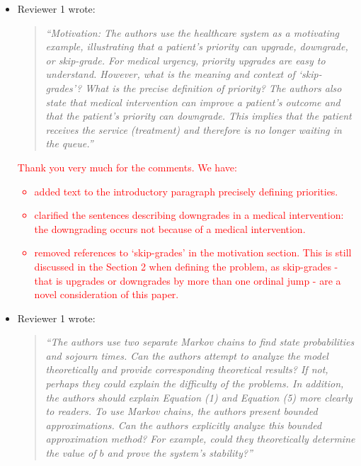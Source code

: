 \documentclass{article}
\begin{document}
\begin{itemize}

\item Reviewer 1 wrote:
\begin{quote}\it
``Motivation: The authors use the healthcare system as a motivating example, illustrating that a patient’s priority can upgrade, downgrade, or skip-grade. For medical urgency, priority upgrades are easy to understand. However, what is the meaning and context of `skip-grades'? What is the precise definition of priority? The authors also state that medical intervention can improve a patient's outcome and that the patient’s priority can downgrade. This implies that the patient receives the service (treatment) and therefore is no longer waiting in the queue.''
\end{quote}

\textcolor{red}{Thank you very much for the comments. We have:
\begin{itemize}
  \item added text to the introductory paragraph precisely defining priorities.
  \item clarified the sentences describing downgrades in a medical intervention: the downgrading occurs not because of a medical intervention.
  \item removed references to `skip-grades' in the motivation section. This is still discussed in the Section 2 when defining the problem, as skip-grades - that is upgrades or downgrades by more than one ordinal jump - are a novel consideration of this paper.
\end{itemize}
}

\item Reviewer 1 wrote:
\begin{quote}\it
``The authors use two separate Markov chains to find state probabilities and sojourn times. Can the authors attempt to analyze the model theoretically and provide corresponding theoretical results? If not, perhaps they could explain the difficulty of the problems. In addition, the authors should explain Equation (1) and Equation (5) more clearly to readers. To use Markov chains, the authors present bounded approximations. Can the authors explicitly analyze this bounded approximation method? For example, could they theoretically determine the value of $b$ and prove the system's stability?''
\end{quote}


\end{itemize}
\end{document}
